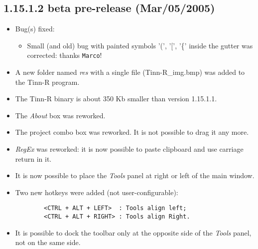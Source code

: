 \subsection*{1.15.1.2 beta pre-release (Mar/05/2005)}
\begin{itemize}
  \item Bug(s) fixed:
    \begin{itemize}
      \item Small (and old) bug with painted symbols '(', '[', '\{' inside the gutter was corrected: thanks \texttt{Marco}!
    \end{itemize}
  \item A new folder named \textit{res} with a single file (Tinn-R\_img.bmp) was added to the Tinn-R program.
  \item The Tinn-R binary is about 350 Kb smaller than version 1.15.1.1.
  \item The \textit{About} box was reworked.
  \item The project combo box was reworked. It is not possible to drag it any more.
  \item \textit{RegEx} was reworked: it is now possible to paste clipboard and use carriage return in it.
  \item It is now possible to place the \textit{Tools} panel at right or left of the main window.
  \item Two new hotkeys were added (not user-configurable):

    \begin{footnotesize}
      \begin{verbatim}
        <CTRL + ALT + LEFT>  : Tools align left;
        <CTRL + ALT + RIGHT> : Tools align Right.
      \end{verbatim}
    \end{footnotesize}

  \item It is possible to dock the \RR{} toolbar only at the opposite
    side of the \textit{Tools} panel, not on the same side.
\end{itemize}


